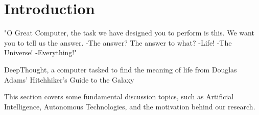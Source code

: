 \chapter{Introduction}
\epigraph{"O Great Computer, the task we have designed you to perform is this. We want you to tell us the answer. -The answer? The answer to what? -Life! -The Universe! -Everything!"}{DeepThought, a computer tasked to find the meaning of life from Douglas Adams' Hitchhiker's Guide to the Galaxy}
This section covers some fundamental discussion topics, such as Artificial Intelligence, Autonomous Technologies, and the motivation behind our research. 


